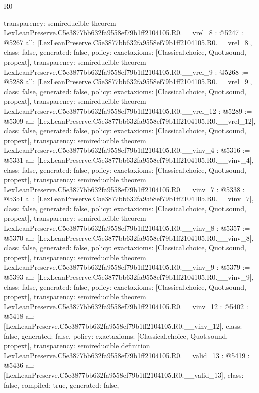 \begin{lexlean}{R0}
\begin{coremodule}
{  transparency: semireducible
}
theorem LexLeanPreserve.C5e3877bb632fa9558ef79b1ff2104105.R0.__vrel_8 : @5247 := @5267 {
  all: [LexLeanPreserve.C5e3877bb632fa9558ef79b1ff2104105.R0.__vrel_8],
  class: false,
  generated: false,
  policy: exact{axioms: [Classical.choice, Quot.sound, propext]},
  transparency: semireducible
}
theorem LexLeanPreserve.C5e3877bb632fa9558ef79b1ff2104105.R0.__vrel_9 : @5268 := @5288 {
  all: [LexLeanPreserve.C5e3877bb632fa9558ef79b1ff2104105.R0.__vrel_9],
  class: false,
  generated: false,
  policy: exact{axioms: [Classical.choice, Quot.sound, propext]},
  transparency: semireducible
}
theorem LexLeanPreserve.C5e3877bb632fa9558ef79b1ff2104105.R0.__vrel_12 : @5289 := @5309 {
  all: [LexLeanPreserve.C5e3877bb632fa9558ef79b1ff2104105.R0.__vrel_12],
  class: false,
  generated: false,
  policy: exact{axioms: [Classical.choice, Quot.sound, propext]},
  transparency: semireducible
}
theorem LexLeanPreserve.C5e3877bb632fa9558ef79b1ff2104105.R0.__vinv_4 : @5316 := @5331 {
  all: [LexLeanPreserve.C5e3877bb632fa9558ef79b1ff2104105.R0.__vinv_4],
  class: false,
  generated: false,
  policy: exact{axioms: [Classical.choice, Quot.sound, propext]},
  transparency: semireducible
}
theorem LexLeanPreserve.C5e3877bb632fa9558ef79b1ff2104105.R0.__vinv_7 : @5338 := @5351 {
  all: [LexLeanPreserve.C5e3877bb632fa9558ef79b1ff2104105.R0.__vinv_7],
  class: false,
  generated: false,
  policy: exact{axioms: [Classical.choice, Quot.sound, propext]},
  transparency: semireducible
}
theorem LexLeanPreserve.C5e3877bb632fa9558ef79b1ff2104105.R0.__vinv_8 : @5357 := @5370 {
  all: [LexLeanPreserve.C5e3877bb632fa9558ef79b1ff2104105.R0.__vinv_8],
  class: false,
  generated: false,
  policy: exact{axioms: [Classical.choice, Quot.sound, propext]},
  transparency: semireducible
}
theorem LexLeanPreserve.C5e3877bb632fa9558ef79b1ff2104105.R0.__vinv_9 : @5379 := @5393 {
  all: [LexLeanPreserve.C5e3877bb632fa9558ef79b1ff2104105.R0.__vinv_9],
  class: false,
  generated: false,
  policy: exact{axioms: [Classical.choice, Quot.sound, propext]},
  transparency: semireducible
}
theorem LexLeanPreserve.C5e3877bb632fa9558ef79b1ff2104105.R0.__vinv_12 : @5402 := @5418 {
  all: [LexLeanPreserve.C5e3877bb632fa9558ef79b1ff2104105.R0.__vinv_12],
  class: false,
  generated: false,
  policy: exact{axioms: [Classical.choice, Quot.sound, propext]},
  transparency: semireducible
}
definition LexLeanPreserve.C5e3877bb632fa9558ef79b1ff2104105.R0.__valid_13 : @5419 := @5436 {
  all: [LexLeanPreserve.C5e3877bb632fa9558ef79b1ff2104105.R0.__valid_13],
  class: false,
  compiled: true,
  generated: false,
}
\end{coremodule}
\end{lexlean}
